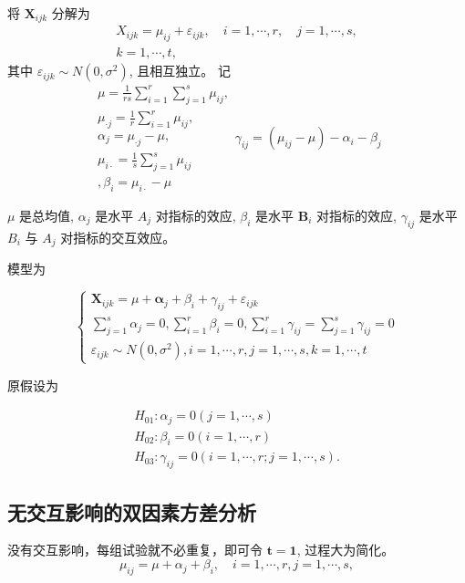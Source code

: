 将 \( \boldsymbol{X}_{i j k} \) 分解为
$$
\begin{array}{c}
X_{i j k}=\mu_{i j}+\varepsilon_{i j k}, \quad i=1, \cdots, r, \quad j=1, \cdots, s, \\
k=1, \cdots, t,
\end{array}
$$
其中 \( \varepsilon_{i j k} \sim N\left(0, \sigma^{2}\right) \), 且相互独立。 记
$$
\begin{array}{l}
\mu=\frac{1}{r s} \sum_{i=1}^{r} \sum_{j=1}^{s} \mu_{i j}, \\ \mu_{\cdot j}=\frac{1}{r} \sum_{i=1}^{r} \mu_{i j}, \\
 \alpha_{j}=\mu_{\cdot j}-\mu, \\
\mu_{i \cdot}=\frac{1}{s} \sum_{j=1}^{s} \mu_{i j} \\, 
 \beta_{i}=\mu_{i \cdot}-\mu
\end{array}
\gamma_{i j}=\left(\mu_{i j}-\mu\right)-\alpha_{i}-\beta_{j}
$$

\( \mu \) 是总均值, \( \alpha_{j} \) 是水平 \( A_{j} \) 对指标的效应, \( \beta_{i} \) 是水平 \( \boldsymbol{B}_{i} \)
对指标的效应, \( \gamma_{i j} \) 是水平 \( B_{i} \) 与 \( A_{j} \) 对指标的交互效应。

模型为

$$ \left\{\begin{array}{l}\boldsymbol{X}_{i j k}=\mu+\boldsymbol{\alpha}_{j}+\beta_{i}+\gamma_{i j}+\varepsilon_{i j k} \\ \sum_{j=1}^{s} \alpha_{j}=0, \sum_{i=1}^{r} \beta_{i}=0, \sum_{i=1}^{r} \gamma_{i j}=\sum_{j=1}^{s} \gamma_{i j}=0 \\ \varepsilon_{i j k} \sim N\left(0, \sigma^{2}\right), i=1, \cdots, r, j=1, \cdots, s, k=1, \cdots, t\end{array}\right. $$

原假设为

$$
\begin{array}{l}
H_{01}: \alpha_{j}=0(j=1, \cdots, s) \\
H_{02}: \beta_{i}=0(i=1, \cdots, r) \\
H_{03}: \gamma_{i j}=0(i=1, \cdots, r ; j=1, \cdots, s) .
\end{array}
$$

\subsection{无交互影响的双因素方差分析}

没有交互影响，每组试验就不必重复，即可令 \( \boldsymbol{t}=\mathbf{1} \),
过程大为简化。
$$
\mu_{i j}=\mu+\alpha_{j}+\beta_{i}, \quad i=1, \cdots, r, j=1, \cdots, s,
$$

